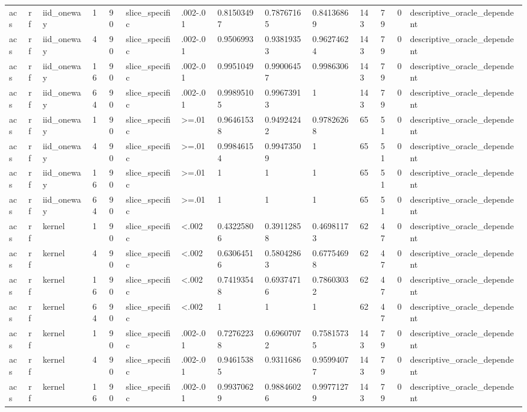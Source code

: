\begin{tabular}{llllllllllllll}
acs & rf & iid\_oneway & 1 & 90 & slice\_specific & .002-.01 & 0.81503497 & 0.78767165 & 0.84136869 & 143 & 79 & 0 & descriptive\_oracle\_dependent \\
acs & rf & iid\_oneway & 4 & 90 & slice\_specific & .002-.01 & 0.9506993 & 0.93819353 & 0.96274624 & 143 & 79 & 0 & descriptive\_oracle\_dependent \\
acs & rf & iid\_oneway & 16 & 90 & slice\_specific & .002-.01 & 0.9951049 & 0.99006457 & 0.9986306 & 143 & 79 & 0 & descriptive\_oracle\_dependent \\
acs & rf & iid\_oneway & 64 & 90 & slice\_specific & .002-.01 & 0.99895105 & 0.99673913 & 1 & 143 & 79 & 0 & descriptive\_oracle\_dependent \\
acs & rf & iid\_oneway & 1 & 90 & slice\_specific & >=.01 & 0.96461538 & 0.94924242 & 0.97826268 & 65 & 51 & 0 & descriptive\_oracle\_dependent \\
acs & rf & iid\_oneway & 4 & 90 & slice\_specific & >=.01 & 0.99846154 & 0.99473509 & 1 & 65 & 51 & 0 & descriptive\_oracle\_dependent \\
acs & rf & iid\_oneway & 16 & 90 & slice\_specific & >=.01 & 1 & 1 & 1 & 65 & 51 & 0 & descriptive\_oracle\_dependent \\
acs & rf & iid\_oneway & 64 & 90 & slice\_specific & >=.01 & 1 & 1 & 1 & 65 & 51 & 0 & descriptive\_oracle\_dependent \\
acs & rf & kernel & 1 & 90 & slice\_specific & <.002 & 0.43225806 & 0.39112858 & 0.46981173 & 62 & 47 & 0 & descriptive\_oracle\_dependent \\
acs & rf & kernel & 4 & 90 & slice\_specific & <.002 & 0.63064516 & 0.58042863 & 0.67754698 & 62 & 47 & 0 & descriptive\_oracle\_dependent \\
acs & rf & kernel & 16 & 90 & slice\_specific & <.002 & 0.74193548 & 0.69374716 & 0.78603032 & 62 & 47 & 0 & descriptive\_oracle\_dependent \\
acs & rf & kernel & 64 & 90 & slice\_specific & <.002 & 1 & 1 & 1 & 62 & 47 & 0 & descriptive\_oracle\_dependent \\
acs & rf & kernel & 1 & 90 & slice\_specific & .002-.01 & 0.72762238 & 0.69607072 & 0.75815735 & 143 & 79 & 0 & descriptive\_oracle\_dependent \\
acs & rf & kernel & 4 & 90 & slice\_specific & .002-.01 & 0.94615385 & 0.9311686 & 0.95994077 & 143 & 79 & 0 & descriptive\_oracle\_dependent \\
acs & rf & kernel & 16 & 90 & slice\_specific & .002-.01 & 0.99370629 & 0.98846026 & 0.99771279 & 143 & 79 & 0 & descriptive\_oracle\_dependent \\

\end{tabular}
